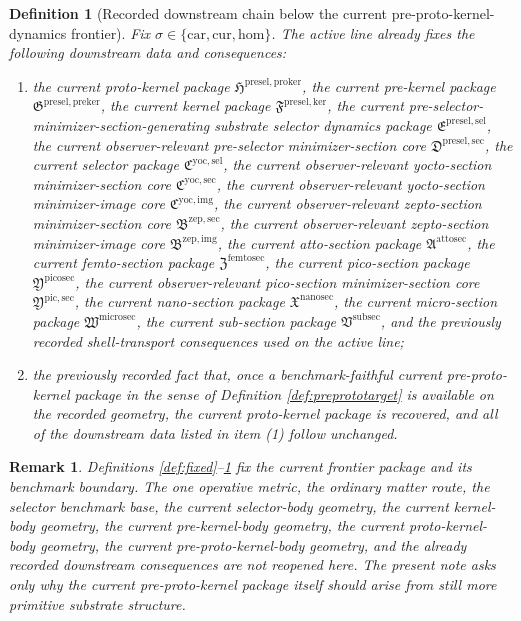 \documentclass[11pt]{article}
\newcommand{\Car}{\mathrm{car}}
\newcommand{\Cur}{\mathrm{cur}}
\newcommand{\Hom}{\mathrm{hom}}
\newcommand{\SubSectionPackage}{\mathfrak V^{\mathrm{subsec}}}
\newcommand{\MicroSectionPackage}{\mathfrak W^{\mathrm{microsec}}}
\newcommand{\NanoSectionPackage}{\mathfrak X^{\mathrm{nanosec}}}
\newcommand{\PicoSectionPackage}{\mathfrak Y^{\mathrm{picosec}}}
\newcommand{\PicoMinSectionCore}{\mathfrak Y^{\mathrm{pic,sec}}}
\newcommand{\FemtoSectionPackage}{\mathfrak Z^{\mathrm{femtosec}}}
\newcommand{\AttoSectionPackage}{\mathfrak A^{\mathrm{attosec}}}
\newcommand{\ZeptoImageCore}{\mathfrak B^{\mathrm{zep,img}}}
\newcommand{\ZeptoMinSectionCore}{\mathfrak B^{\mathrm{zep,sec}}}
\newcommand{\YoctoImageCore}{\mathfrak C^{\mathrm{yoc,img}}}
\newcommand{\YoctoMinSectionCore}{\mathfrak C^{\mathrm{yoc,sec}}}
\newcommand{\YoctoSelectorPackage}{\mathfrak C^{\mathrm{yoc,sel}}}
\newcommand{\PreSelectorMinSectionCore}{\mathfrak D^{\mathrm{presel,sec}}}
\newcommand{\PreSectionSelectorPackage}{\mathfrak E^{\mathrm{presel,sel}}}
\newcommand{\KernelPackage}{\mathfrak F^{\mathrm{presel,ker}}}
\newcommand{\PreKernelPackage}{\mathfrak G^{\mathrm{presel,preker}}}
\newcommand{\ProtoKernelPackage}{\mathfrak H^{\mathrm{presel,proker}}}
\newtheorem{definition}{Definition}
\newtheorem{remark}{Remark}
\begin{document}
\begin{definition}[Recorded downstream chain below the current pre-proto-kernel-dynamics frontier]
\label{def:downstream}
Fix \(\sigma\in\{\Car,\Cur,\Hom\}\). The active line already fixes the following downstream data and consequences:
\begin{enumerate}
    \item the current proto-kernel package \(\ProtoKernelPackage\), the current pre-kernel package \(\PreKernelPackage\), the current kernel package \(\KernelPackage\), the current pre-selector-minimizer-section-generating substrate selector dynamics package \(\PreSectionSelectorPackage\), the current observer-relevant pre-selector minimizer-section core \(\PreSelectorMinSectionCore\), the current selector package \(\YoctoSelectorPackage\), the current observer-relevant yocto-section minimizer-section core \(\YoctoMinSectionCore\), the current observer-relevant yocto-section minimizer-image core \(\YoctoImageCore\), the current observer-relevant zepto-section minimizer-section core \(\ZeptoMinSectionCore\), the current observer-relevant zepto-section minimizer-image core \(\ZeptoImageCore\), the current atto-section package \(\AttoSectionPackage\), the current femto-section package \(\FemtoSectionPackage\), the current pico-section package \(\PicoSectionPackage\), the current observer-relevant pico-section minimizer-section core \(\PicoMinSectionCore\), the current nano-section package \(\NanoSectionPackage\), the current micro-section package \(\MicroSectionPackage\), the current sub-section package \(\SubSectionPackage\), and the previously recorded shell-transport consequences used on the active line;
    \item the previously recorded fact that, once a benchmark-faithful current pre-proto-kernel package in the sense of Definition \ref{def:preprototarget} is available on the recorded geometry, the current proto-kernel package is recovered, and all of the downstream data listed in item (1) follow unchanged.
\end{enumerate}
\end{definition}

\begin{remark}
Definitions \ref{def:fixed}--\ref{def:downstream} fix the current frontier package and its benchmark boundary. The one operative metric, the ordinary matter route, the selector benchmark base, the current selector-body geometry, the current kernel-body geometry, the current pre-kernel-body geometry, the current proto-kernel-body geometry, the current pre-proto-kernel-body geometry, and the already recorded downstream consequences are not reopened here. The present note asks only why the current pre-proto-kernel package itself should arise from still more primitive substrate structure.
\end{remark}
\end{document}
